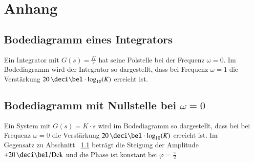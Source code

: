 \section{Anhang}

\subsection{Bodediagramm eines Integrators}
\label{Bodediagramm eines Integrators}

Ein Integrator mit $G(s) = \frac{K}{s}$ hat seine Polstelle bei der Frequenz $\omega = 0$. Im Bodediagramm wird der Integrator so
dargestellt, dass bei Frequenz $\omega = 1$ die Verstärkung $20 \, \deci \bel \cdot \log_{10}(K)$ erreicht ist.



\subsection[Bodediagramm mit Nullstelle bei omega = 0]{Bodediagramm mit Nullstelle bei $\omega = 0$}

Ein System mit $G(s) = K \cdot s$ wird im Bodediagramm so dargestellt, dass bei bei Frequenz $\omega = 0$ die Verstärkung
$20 \, \deci \bel \cdot \log_{10}(K)$ erreicht ist. Im Gegensatz zu Abschnitt ~\ref{Bodediagramm eines Integrators} beträgt die Steigung
der Amplitude $+20 \, \deci \bel / \mathrm{Dek}$ und die Phase ist konstant bei $\varphi = \frac{\pi}{2}$
